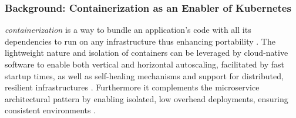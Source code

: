 \documentclass[11pt, a4paper, oneside, listof=totoc]{scrartcl}
\begin{document}
            \subsubsection{Background: Containerization as an Enabler of Kubernetes}\label{subsubsec:containerization}
                \textit{\Gls{containerization}} is a way to bundle an application's code with all its
                dependencies to run on any infrastructure thus enhancing portability
                \parencite{awsWhatIsContainerization,dockerWhatContainer}.
                The lightweight nature and isolation of \glspl{container} can be leveraged by
                cloud-native software to enable both vertical and horizontal autoscaling,
                facilitated by fast startup times, as well as self-healing mechanisms and support
                for distributed, resilient infrastructures
                \parencites{kubernetesAutoscalingWorkloads}{kubernetesSelfHealing}
                    {awsWhatIsContainerization}[pp.~58--59]{davis2019}.
                Furthermore it complements the microservice architectural pattern by enabling
                isolated, low overhead deployments, ensuring consistent environments
                \parencite[p.~209]{balalaie2016}.
\end{document}
